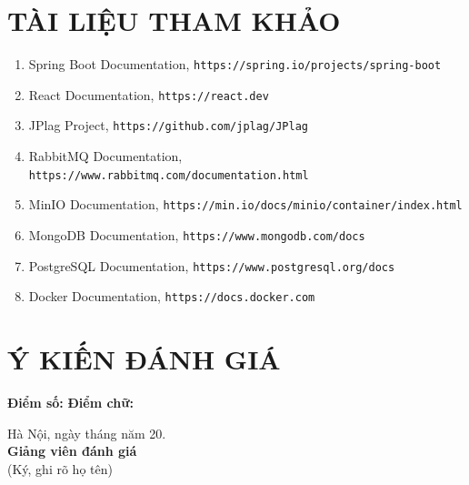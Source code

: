 \documentclass[12pt,a4paper]{article}
\newcommand{\url}[1]{\texttt{#1}}
\begin{document}
\section*{TÀI LIỆU THAM KHẢO}

{\renewcommand{\labelenumi}{[\arabic{enumi}]}
\begin{enumerate}
    \item Spring Boot Documentation, \url{https://spring.io/projects/spring-boot}
    \item React Documentation, \url{https://react.dev}
    \item JPlag Project, \url{https://github.com/jplag/JPlag}
    \item RabbitMQ Documentation, \url{https://www.rabbitmq.com/documentation.html}
    \item MinIO Documentation, \url{https://min.io/docs/minio/container/index.html}
    \item MongoDB Documentation, \url{https://www.mongodb.com/docs}
    \item PostgreSQL Documentation, \url{https://www.postgresql.org/docs}
    \item Docker Documentation, \url{https://docs.docker.com}
\end{enumerate}}

\newpage
\section*{Ý KIẾN ĐÁNH GIÁ}

\vspace{0.5cm}
\noindent\dotfill

\vspace{0.8cm}
\noindent\dotfill

\vspace{0.8cm}
\noindent\dotfill

\vspace{0.8cm}
\noindent\dotfill

\vspace{0.8cm}
\noindent\dotfill

\vspace{1.2cm}
\noindent \textbf{Điểm số:} \dotfill \quad \textbf{Điểm chữ:} \dotfill

\vspace{1.2cm}
\begin{flushright}
Hà Nội, ngày \hspace{1cm} tháng \hspace{1cm} năm 20\hspace{0.5cm}.\\
\vspace{0.5cm}
\textbf{Giảng viên đánh giá}\\
(Ký, ghi rõ họ tên)
\end{flushright}
\end{document}
